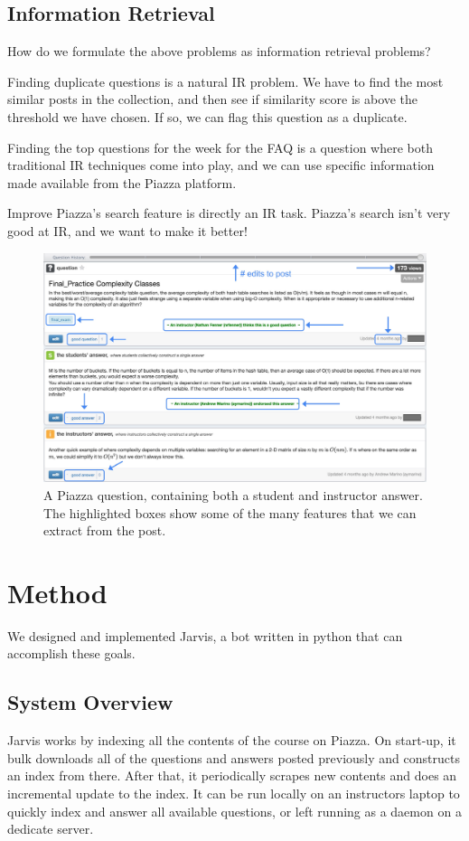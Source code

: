 \documentclass[sigconf]{acmart}
\begin{document}
\subsection{Information Retrieval}
How do we formulate the above problems as information retrieval problems?

Finding duplicate questions is a natural IR problem. We have to find the most similar posts in the collection, and then see if similarity score is above the threshold we have chosen. If so, we can flag this question as a duplicate.

Finding the top questions for the week for the FAQ is a question where both traditional IR techniques come into play, and we can use specific information made available from the Piazza platform.

Improve Piazza's search feature is directly an IR task. Piazza's search isn't very good at IR, and we want to make it better!

\begin{figure}
\includegraphics[width=\textwidth]{piazza_stats}
\caption{A Piazza question, containing both a student and instructor answer. The highlighted boxes show some of the many features that we can extract from the post.}
\end{figure}

\section{Method}
We designed and implemented Jarvis, a bot written in python that can accomplish these goals. 

\subsection{System Overview}
Jarvis works by indexing all the contents of the course on Piazza. On start-up, it bulk downloads all of the questions and answers posted previously and constructs an index from there. After that, it periodically scrapes new contents and does an incremental update to the index. It can be run locally on an instructors laptop to quickly index and answer all available questions, or left running as a daemon on a dedicate server.
\end{document}
